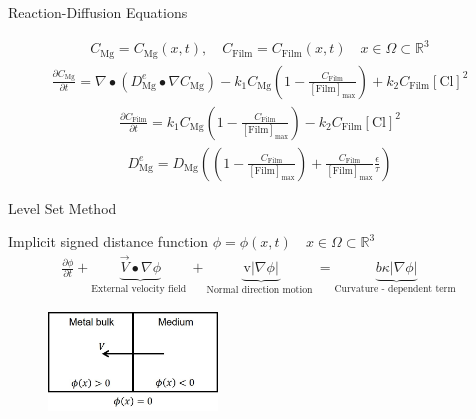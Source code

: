 \documentclass[11pt,t]{beamer}
\begin{document}
\begin{frame}[fragile]{Reaction-Diffusion Equations}

\vspace{-0.8cm}


\begin{gather*}
C_{\mathrm{Mg}} = C_{\mathrm{Mg}}(x,t), \quad C_{\mathrm{Film}} = C_{\mathrm{Film}}(x,t) \quad x \in \Omega \subset \mathbb{R}^{3}
\end{gather*}
\begin{gather*}
\frac{\partial C_{\mathrm{Mg}}}{\partial t}=\nabla \bullet \left(D_{\mathrm{Mg}}^{e} \bullet  \nabla C_{\mathrm{Mg}} \right)-k_{1} C_{\mathrm{Mg}}\left(1-\frac{C_{\mathrm{Film}}}{[\mathrm{Film}]_{\max }}\right) +k_{2} C_{\mathrm{Film}} [\mathrm{Cl}]^{2}
\end{gather*}
\begin{gather*}
\frac{\partial C_\mathrm{Film}}{\partial t}=k_{1} C_{\mathrm{Mg}}\left(1-\frac{C_{\mathrm{Film}}}{[\mathrm{Film}]_{\max }}\right) -k_{2} C_{\mathrm{Film}} [\mathrm{Cl}]^{2}
\end{gather*}
\begin{gather*}
D_{\mathrm{Mg}}^{e}=D_{\mathrm{Mg}}\left(\left(1-\frac{C_{\mathrm{Film}}}{[\mathrm{Film}]_{\max }}\right)+\frac{C_{\mathrm{Film}}}{[\mathrm{Film}]_{\max }} \frac{\epsilon}{\tau}\right)
\end{gather*}

\end{frame}


\begin{frame}[fragile]{Level Set Method}  

Implicit signed distance function  $\phi = \phi(x,t) \quad x \in \Omega \subset \mathbb{R}^{3}$
\begin{gather*} \label{eq:lsm_full}
\frac{\partial \phi}{\partial t}+\underbrace{\overrightarrow{V} \bullet \nabla \phi}_{\text {External velocity field }}+\underbrace{\mathrm{v}|\nabla \phi|}_{\text {Normal direction motion }}=\underbrace{b \kappa|\nabla \phi|}_{\text {Curvature - dependent term }}
\end{gather*}


	\begin{figure}
			\centering
			\includegraphics[width=0.4\textwidth]{level_set_domain}
			 
	\end{figure}

\end{frame}
\end{document}
